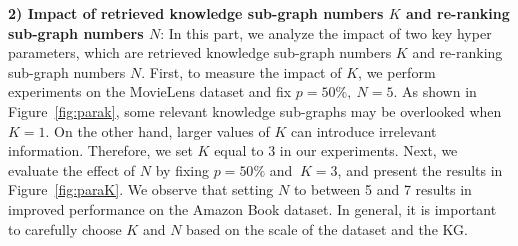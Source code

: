 \textbf{2) Impact of retrieved knowledge sub-graph numbers $K$ and re-ranking sub-graph numbers $N$}:
In this part, we analyze the impact of two key hyper parameters, which are retrieved knowledge sub-graph numbers $K$ and re-ranking sub-graph numbers $N$. First, to measure the impact of $K$, we perform experiments on the MovieLens dataset and fix $p=50\%, \ N=5$. As shown in Figure~\ref{fig:parak}, some relevant knowledge sub-graphs may be overlooked when $K=1$. On the other hand, larger values of $K$ can introduce irrelevant information. Therefore, we set $K$ equal to 3 in our experiments. Next, we evaluate the effect of $N$ by fixing $p=50\%$ and $ \ K=3$, and present the results in Figure~\ref{fig:paraK}. We observe that setting $N$ to between 5 and 7 results in improved performance on the Amazon Book dataset.
In general, it is important to carefully choose $K$ and $N$ based on the scale of the dataset and the KG.
